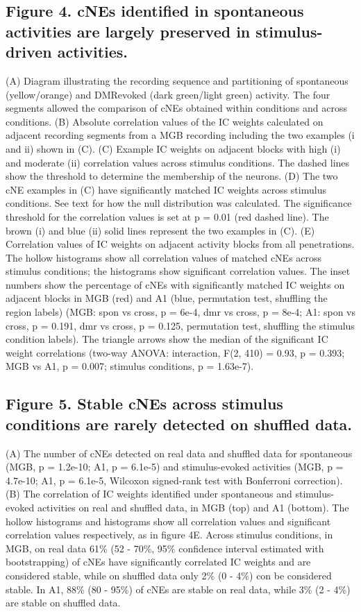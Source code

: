 \documentclass[11pt]{article}
\begin{document}
\subsection*{Figure 4. cNEs identified in spontaneous activities are largely preserved in stimulus-driven activities.}
(A) Diagram illustrating the recording sequence and partitioning of spontaneous (yellow/orange) and DMR\-evoked (dark green/light green) activity. The four segments allowed the comparison of cNEs obtained within conditions and across conditions.
(B) Absolute correlation values of the IC weights calculated on adjacent recording segments from a MGB recording including the two examples (i and ii) shown in (C).
(C) Example IC weights on adjacent blocks with high (i) and moderate (ii) correlation values across stimulus conditions. The dashed lines show the threshold to determine the membership of the neurons.
(D) The two cNE examples in (C) have significantly matched IC weights across stimulus conditions. See text for how the null distribution was calculated. The significance threshold for the correlation values is set at p = 0.01 (red dashed line). The brown (i) and blue (ii) solid lines represent the two examples in (C). 
(E) Correlation values of IC weights on adjacent activity blocks from all penetrations. The hollow histograms show all correlation values of matched cNEs across stimulus conditions; the histograms show significant correlation values. The inset numbers show the percentage of cNEs with significantly matched IC weights on adjacent blocks in MGB (red) and A1 (blue, permutation test, shuffling the region labels) (MGB: spon vs cross, p = 6e-4, dmr vs cross, p = 8e-4; A1: spon vs cross, p = 0.191, dmr vs cross, p = 0.125, permutation test, shuffling the stimulus condition labels). The triangle arrows show the median of the significant IC weight correlations (two-way ANOVA: interaction, F(2, 410) = 0.93, p = 0.393; MGB vs A1, p = 0.007; stimulus conditions, p = 1.63e-7).

\subsection*{Figure 5. Stable cNEs across stimulus conditions are rarely detected on shuffled data.}
(A) The number of cNEs detected on real data and shuffled data for spontaneous (MGB, p = 1.2e-10; A1, p = 6.1e-5) and stimulus-evoked activities (MGB, p = 4.7e-10; A1, p = 6.1e-5, Wilcoxon signed-rank test with Bonferroni correction).
(B) The correlation of IC weights identified under spontaneous and stimulus-evoked activities on real and shuffled data, in MGB (top) and A1 (bottom). The hollow histograms and histograms show all correlation values and significant correlation values respectively, as in figure 4E. Across stimulus conditions, in MGB, on real data 61\% (52 - 70\%, 95\% confidence interval estimated with bootstrapping) of cNEs have significantly correlated IC weights and are considered stable, while on shuffled data only 2\% (0 - 4\%) con be considered stable. In A1, 88\% (80 - 95\%) of cNEs are stable on real data, while 3\% (2 - 4\%) are stable on shuffled data.
\end{document}
